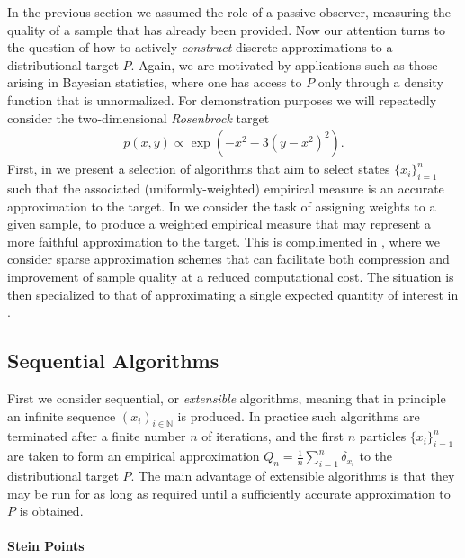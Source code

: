 \documentclass[12pt,paper=letter]{scrreprt}
\begin{document}
In the previous section we assumed the role of a passive observer, measuring the quality of a sample that has already been provided.
Now our attention turns to the question of how to actively \emph{construct} discrete approximations to a distributional target $P$.
Again, we are motivated by applications such as those arising in Bayesian statistics, where one has access to $P$ only through a density function that is unnormalized.
For demonstration purposes we will repeatedly consider the two-dimensional \emph{Rosenbrock} target
\begin{align}
    p(x,y) \propto \exp\left(-x^2 - 3(y-x^2)^2 \right) .  \label{eq: Rosenbrock}
\end{align}
First, in  we present a selection of algorithms that aim to select states $\{x_i\}_{i=1}^n$ such that the associated (uniformly-weighted) empirical measure is an accurate approximation to the target.
In  we consider the task of assigning weights to a given sample, to produce a weighted empirical measure that may represent a more faithful approximation to the target.
This is complimented in , where we consider sparse approximation schemes that can facilitate both compression and improvement of sample quality at a reduced computational cost.
The situation is then specialized to that of approximating a single expected quantity of interest in .


\subsection{Sequential Algorithms}
\label{subsec: sequential}

First we consider sequential, or \emph{extensible} algorithms, meaning that in principle an infinite sequence $(x_i)_{i \in \mathbb{N}}$ is produced.
In practice such algorithms are terminated after a finite number $n$ of iterations, and the first $n$ particles $\{x_i\}_{i=1}^n$ are taken to form an empirical approximation $Q_n = \frac{1}{n} \sum_{i=1}^n \delta_{x_i}$ to the distributional target $P$.
The main advantage of extensible algorithms is that they may be run for as long as required until a sufficiently accurate approximation to $P$ is obtained.

\paragraph{Stein Points}
\end{document}

